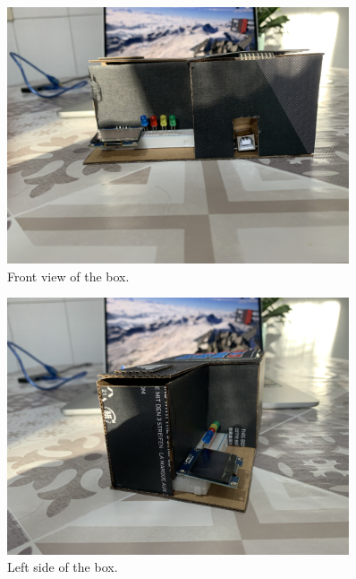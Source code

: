 \documentclass{article}
\begin{document}
\begin{figure}[!h]
  \centering
  \vspace*{\fill}
  \includegraphics[width=0.9\textwidth]{FrontView.jpg}
  \caption{Front view of the box.}
  \vspace*{\fill}
\end{figure}

\newpage

\begin{figure}[!h]
  \centering
  \vspace*{\fill}
  \includegraphics[width=0.9\textwidth]{LeftSideView.jpg}
  \caption{Left side of the box.}
  \vspace*{\fill}
\end{figure}

\newpage
\end{document}
